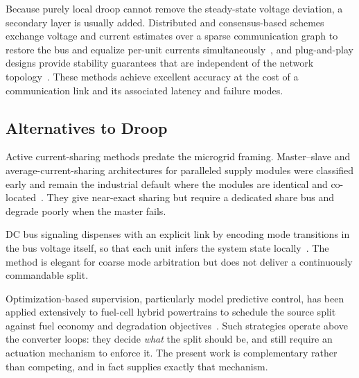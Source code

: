 Because purely local droop cannot remove the steady-state voltage deviation, a
secondary layer is usually added. Distributed and consensus-based schemes
exchange voltage and current estimates over a sparse communication graph to
restore the bus and equalize per-unit currents
simultaneously~\cite{nasirian2015cooperative,anand2013distributed,kumar2020distributed},
and plug-and-play designs provide stability guarantees that are independent of
the network topology~\cite{tucci2018plugandplay}. These methods achieve excellent
accuracy at the cost of a communication link and its associated latency and
failure modes.

\subsection{Alternatives to Droop}

Active current-sharing methods predate the microgrid framing. Master--slave and
average-current-sharing architectures for paralleled supply modules were
classified early and remain the industrial default where the modules are
identical and co-located~\cite{luo1999classification,panov2008stability}. They
give near-exact sharing but require a dedicated share bus and degrade poorly
when the master fails.

DC bus signaling dispenses with an explicit link by encoding mode transitions in
the bus voltage itself, so that each unit infers the system state
locally~\cite{schonberger2006dbs,panda2021dbs}. The method is elegant for
coarse mode arbitration but does not deliver a continuously commandable split.

Optimization-based supervision, particularly model predictive control, has been
applied extensively to fuel-cell hybrid powertrains to schedule the source split
against fuel economy and degradation
objectives~\cite{vermillion2011mpc,hu2021mpcreview,zhou2022mpc}. Such strategies
operate above the converter loops: they decide \emph{what} the split should be, and
still require an actuation mechanism to enforce it. The present work is
complementary rather than competing, and in fact supplies exactly that
mechanism.

